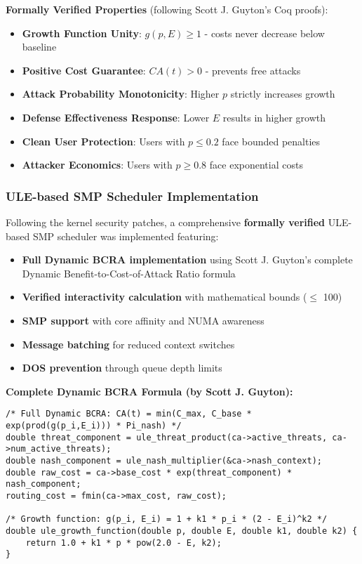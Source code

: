\documentclass[11pt,a4paper]{article}
\begin{document}
\textbf{Formally Verified Properties} (following Scott J. Guyton's Coq proofs):
\begin{itemize}
    \item \textbf{Growth Function Unity}: $g(p,E) \geq 1$ - costs never decrease below baseline
    \item \textbf{Positive Cost Guarantee}: $CA(t) > 0$ - prevents free attacks
    \item \textbf{Attack Probability Monotonicity}: Higher $p$ strictly increases growth
    \item \textbf{Defense Effectiveness Response}: Lower $E$ results in higher growth
    \item \textbf{Clean User Protection}: Users with $p \leq 0.2$ face bounded penalties
    \item \textbf{Attacker Economics}: Users with $p \geq 0.8$ face exponential costs
\end{itemize}

\subsubsection{ULE-based SMP Scheduler Implementation}

Following the kernel security patches, a comprehensive \textbf{formally verified} ULE-based SMP scheduler was implemented featuring:

\begin{itemize}
    \item \textbf{Full Dynamic BCRA implementation} using Scott J. Guyton's complete Dynamic Benefit-to-Cost-of-Attack Ratio formula
    \item \textbf{Verified interactivity calculation} with mathematical bounds ($\leq$ 100)
    \item \textbf{SMP support} with core affinity and NUMA awareness
    \item \textbf{Message batching} for reduced context switches
    \item \textbf{DOS prevention} through queue depth limits
\end{itemize}

\textbf{Complete Dynamic BCRA Formula (by Scott J. Guyton):}
\begin{lstlisting}[style=cstyle]
/* Full Dynamic BCRA: CA(t) = min(C_max, C_base * exp(prod(g(p_i,E_i))) * Pi_nash) */
double threat_component = ule_threat_product(ca->active_threats, ca->num_active_threats);
double nash_component = ule_nash_multiplier(&ca->nash_context);
double raw_cost = ca->base_cost * exp(threat_component) * nash_component;
routing_cost = fmin(ca->max_cost, raw_cost);

/* Growth function: g(p_i, E_i) = 1 + k1 * p_i * (2 - E_i)^k2 */
double ule_growth_function(double p, double E, double k1, double k2) {
    return 1.0 + k1 * p * pow(2.0 - E, k2);
}
\end{lstlisting}
\end{document}
